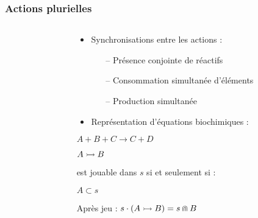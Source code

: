 
\begin{frame}[c]
  \frametitle{Actions plurielles}

\begin{columns}
\begin{column}{.4\textwidth}


\end{column}
\begin{column}{.55\textwidth}
\begin{center}

\begin{itemize}
  \item Synchronisations entre les actions :
  \begin{itemize}
    \item[--] Présence conjointe de réactifs
    \item[--] Consommation simultanée d'éléments
    \item[--] Production simultanée
  \end{itemize}
  \item Représentation d'équations biochimiques :
\end{itemize}

\smallskip
$A + B + C \rightarrow C + D$

\vspace*{.5cm}


\vspace*{.5cm}
$\mbox{$A \rightarrowtail B$}$

est jouable dans $s$ si et seulement si :

$A \subset s$

\bigskip
Après jeu : $s \cdot (\mbox{$A \rightarrowtail B$}) = s \Cap B$

\end{center}
\end{column}
\end{columns}


\end{frame}
